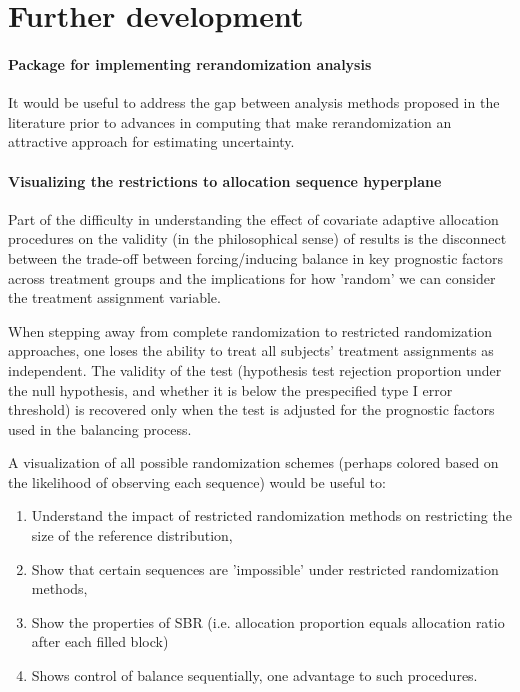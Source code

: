 \section{Further development}
\paragraph{Package for implementing rerandomization analysis} It would be useful to address the gap between analysis methods proposed in the literature prior to advances in computing that make rerandomization an attractive approach for estimating uncertainty.

\paragraph{Visualizing the restrictions to allocation sequence hyperplane} Part of the difficulty in understanding the effect of covariate adaptive allocation procedures on the validity (in the philosophical sense) of results is the disconnect between the trade-off between forcing/inducing balance in key prognostic factors across treatment groups and the implications for how 'random' we can consider the treatment assignment variable.

When stepping away from complete randomization to restricted randomization approaches, one loses the ability to treat all subjects' treatment assignments as independent.
The validity of the test (hypothesis test rejection proportion under the null hypothesis, and whether it is below the prespecified type I error threshold) is recovered only when the test is adjusted for the prognostic factors used in the balancing process. %

A visualization of all possible randomization schemes (perhaps colored based on the likelihood of observing each sequence) would be useful to:
\begin{enumerate}
	\item Understand the impact of restricted randomization methods on restricting the size of the reference distribution,
	\item Show that certain sequences are 'impossible' under restricted randomization methods,
	\item Show the properties of SBR (i.e. allocation proportion equals allocation ratio after each filled block)
	\item Shows control of balance sequentially, one advantage to such procedures.
\end{enumerate}

